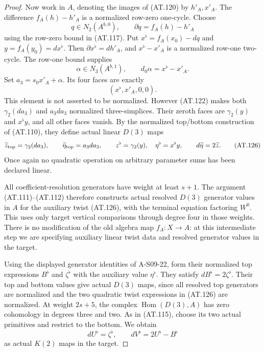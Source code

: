 \begin{proof}
Now work in $A$, denoting the images of (AT.120) by
$h'_A,x'_A$. The difference $f_A(h)-h'_A$ is a normalized
row-zero one-cycle. Choose
\[
 q\in N_2(A^{b,0}),\qquad
                  \partial q=f_A(h)-h'_A
 \tag{AT.123}
\]
using the row-zero bound in (AT.117).
Put $x^\flat=f_A(x_0)-dq$ and $y=f_A(y_0)=dx^\flat$.
Then $\partial x^\flat=dh'_A$, and
$x^\flat-x'_A$ is a normalized row-one two-cycle.
The row-one bound supplies
\[
 \alpha\in N_3(A^{b,1}),\qquad
                  d_0\alpha=x^\flat-x'_A.
 \tag{AT.124}
\]
Set $a_3=s_0x'_A+\alpha$. Its four faces are exactly
\[
                         (x^\flat,x'_A,0,0).
 \tag{AT.125}
\]
This element is not asserted to be normalized.
However (AT.122) makes both
$\gamma_2(da_3)$ and $a_3da_3$ normalized three-simplices.
Their zeroth faces are $\gamma_2(y)$ and $x^\flat y$,
and all other faces vanish. By the normalized top/bottom
construction of (AT.110), they define actual linear
$D(3)$ maps
\[
 \widetilde z_{\rm top}=\gamma_2(da_3),\qquad
 \widetilde\eta_{\rm top}=a_3da_3,\qquad
 z^\flat=\gamma_2(y),\quad \eta^\flat=x^\flat y,
 \qquad d\widetilde\eta=2\widetilde z.
 \tag{AT.126}
\]
Once again no quadratic operation on arbitrary parameter
sums has been declared linear.

All coefficient-resolution generators have weight at least
$s+1$. The argument (AT.111)--(AT.112) therefore constructs
actual resolved $D(3)$ generator values in $A$ for the
auxiliary twist (AT.126), with the terminal equation
factoring $W^0$.
This uses only target vertical comparisons through degree
four in those weights. There is no modification of the
old algebra map $f_A:X\to A$: at this intermediate step
we are specifying auxiliary linear twist data and resolved
generator values in the target.

Using the displayed generator identities of A-S09-22,
form their normalized top expressions $B^\flat$ and
$\zeta^\flat$ with the auxiliary value $\eta^\flat$.
They satisfy $dB^\flat=2\zeta^\flat$.
Their top and bottom values give actual $D(3)$ maps,
since all resolved top generators are normalized and
the two quadratic twist expressions in (AT.126) are
normalized. At weight $2s+5$, the complex
$\operatorname{Hom}(D(3),A)$ has zero cohomology in
degrees three and two. As in (AT.115), choose its
two actual primitives and restrict to the bottom.
We obtain
\[
 dU^\flat=\zeta^\flat,\qquad
                dV^\flat=2U^\flat-B^\flat
 \tag{AT.127}
\]
as actual $K(2)$ maps in the target.


\end{proof}
